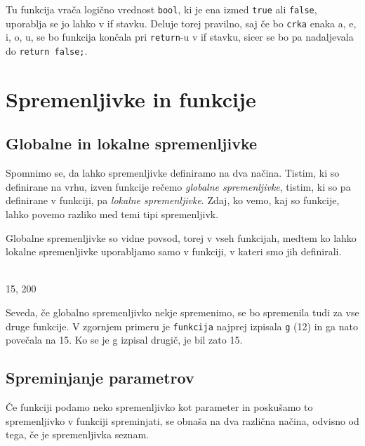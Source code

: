 \documentclass{book}
\begin{document}
Tu funkcija vrača logično vrednost \verb+bool+, ki je ena izmed \verb+true+ ali
\verb+false+, uporablja se jo lahko v if stavku. Deluje torej pravilno, saj če
bo \verb+crka+ enaka a, e, i, o, u, se bo funkcija končala pri \verb+return+-u
v if stavku, sicer se bo pa nadaljevala do \verb+return false;+.


\section{Spremenljivke in funkcije}

\subsection{Globalne in lokalne spremenljivke}

Spomnimo se, da lahko spremenljivke definiramo na dva načina. Tistim, ki so
definirane na vrhu, izven funkcije rečemo \emph{globalne spremenljivke},
tistim, ki so pa definirane v funkciji, pa \emph{lokalne spremenljivke}. Zdaj,
ko vemo, kaj so funkcije, lahko povemo razliko med temi tipi spremenljivk.

Globalne spremenljivke so vidne povsod, torej v vseh funkcijah, medtem ko lahko
lokalne spremenljivke uporabljamo samo v funkciji, v kateri smo jih definirali.

\begin{examples}

    \begin{inout}
         \\
        15, 200
    \end{inout}

\end{examples}

Seveda, če globalno spremenljivko nekje spremenimo, se bo spremenila tudi za
vse druge funkcije. V zgornjem primeru je \verb+funkcija+ najprej izpisala
\verb+g+ (12) in ga nato povečala na 15. Ko se je g izpisal drugič, je bil zato
15.

\subsection{Spreminjanje parametrov}

Če funkciji podamo neko spremenljivko kot
parameter in poskušamo to spremenljivko v funkciji spreminjati, se obnaša na
dva različna načina, odvisno od tega, če je spremenljivka seznam.
\end{document}
